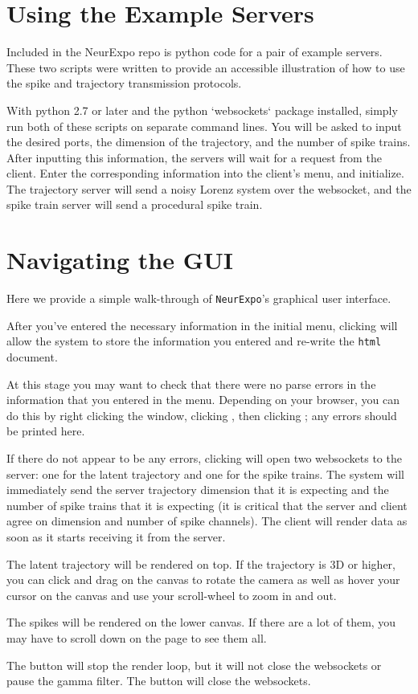 \documentclass[12pt, openany]{book}
\begin{document}
\chapter{Using the Example Servers}

Included in the NeurExpo repo is python code for a pair of example servers. These two scripts were written to provide an accessible illustration of how to use the spike and trajectory transmission protocols.

With python 2.7 or later and the python `websockets` package installed, simply run both of these scripts on separate command lines. You will be asked to input the desired ports, the dimension of the trajectory, and the number of spike trains. After inputting this information, the servers will wait for a request from the client. Enter the corresponding information into the client's menu, and initialize. The trajectory server will send a noisy Lorenz system over the websocket, and the spike train server will send a procedural spike train.


\chapter{Navigating the GUI}

Here we provide a simple walk-through of \texttt{NeurExpo}'s graphical user interface.

After you've entered the necessary information in the initial menu, clicking  will allow the system to store the information you entered and re-write the \texttt{html} document.

At this stage you may want to check that there were no parse errors in the information that you entered in the menu. Depending on your browser, you can do this by right clicking the window, clicking , then clicking ; any errors should be printed here.

If there do not appear to be any errors, clicking  will open two websockets to the server: one for the latent trajectory and one for the spike trains. The system will immediately send the server trajectory dimension that it is expecting and the number of spike trains that it is expecting (it is critical that the server and client agree on dimension and number of spike channels). The client will render data as soon as it starts receiving it from the server.

The latent trajectory will be rendered on top. If the trajectory is 3D or higher, you can click and drag on the canvas to rotate the camera as well as hover your cursor on the canvas and use your scroll-wheel to zoom in and out.

The spikes will be rendered on the lower canvas. If there are a lot of them, you may have to scroll down on the page to see them all.

The  button will stop the render loop, but it will not close the websockets or pause the gamma filter. The  button will close the websockets.



\end{document}
